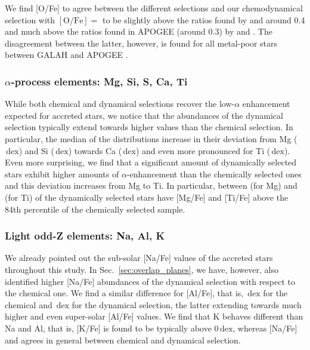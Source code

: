 \documentclass[fleqn,usenatbib]{mnras}
\newcommand{\dex}{\,\mathrm{dex}}	%
\begin{document}
We find [O/Fe] to agree between the different selections and our chemodynamical selection with $\mathrm{[O/Fe]} =$  to be slightly above the ratios found by \citet{Ramirez2012b} and \citet{Nissen2014} around 0.4 and much above the ratios found in APOGEE (around 0.3) by \citet{Hawkins2015} and \citet{Hayes2018}. The disagreement between the latter, however, is found for all metal-poor stars between GALAH and APOGEE \citep[e.g.][]{Buder2018}.

\subsubsection{$\alpha$-process elements: Mg, Si, S, Ca, Ti} \label{sec:chronochemodynamics_alpha}

While both chemical and dynamical selections recover the low-$\alpha$ enhancement expected for accreted stars, we notice that the abundances of the dynamical selection typically extend towards higher values than the chemical selection. In particular, the median of the distributions increase in their deviation from Mg ($\dex$) and Si ($\dex$) towards Ca ($\dex$) and even more pronounced for Ti ($\dex$). Even more surprising, we find that a significant amount of dynamically selected stars exhibit higher amounts of $\alpha$-enhancement than the chemically selected ones and this deviation increases from Mg to Ti. In particular, between  (for Mg) and  (for Ti) of the dynamically selected stars have [Mg/Fe] and [Ti/Fe] above the 84th percentile of the chemically selected sample.

\subsubsection{Light odd-Z elements: Na, Al, K} \label{sec:chronochemodynamics_oddz}

We already pointed out the sub-solar [Na/Fe] values of the accreted stars throughout this study. In Sec.~\ref{sec:overlap_planes}, we have, however, also identified higher [Na/Fe] abundances of the dynamical selection with respect to the chemical one. We find a similar difference for [Al/Fe], that is, $\dex$  for the chemical and $\dex$ for the dynamical selection, the latter extending towards much higher and even super-solar [Al/Fe] values. We find that K behaves different than Na and Al, that is, [K/Fe] is found to be typically above $0\dex$, whereas [Na/Fe] and agrees in general between chemical and dynamical selection.
\end{document}
